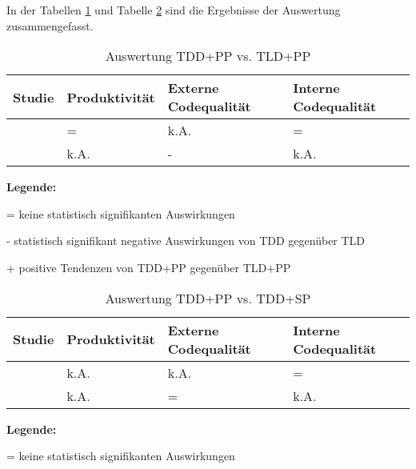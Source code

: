 In der Tabellen \ref{table:TDD+PPAuswertungTDD+PPvsTLD+PP} und Tabelle \ref{table:TDD+PPAuswertungTDD+PPvsTDD+SP} sind die Ergebnisse der Auswertung zusammengefasst.

\begin{table}[bth]
\renewcommand{\arraystretch}{1.3}
\caption{Auswertung TDD+PP vs. TLD+PP}
\label{table:TDD+PPAuswertungTDD+PPvsTLD+PP}
\centering
\begin{threeparttable}
\begin{tabularx}{\columnwidth}{@{}llll@{}}
\toprule
Studie & Produktivität & Externe Codequalität & Interne Codequalität \\ \midrule
\cite{Flohr2006LessonsTeachings} & =\tnote{+} & k.A. & = \\
\cite{Madeyski2005PreliminaryQuality} & k.A. & - & k.A. \\ \bottomrule
\end{tabularx}
\medskip
      \footnotesize\textbf{Legende:}\smallskip
      \begin{tablenotes}\footnotesize
      \item = keine statistisch signifikanten Auswirkungen
      \item - statistisch signifikant negative Auswirkungen von TDD gegenüber TLD
      \item[+] positive Tendenzen von TDD+PP gegenüber TLD+PP
      \end{tablenotes}
\end{threeparttable}
\end{table}

\begin{table}[bth]
\renewcommand{\arraystretch}{1.3}
\caption{Auswertung TDD+PP vs. TDD+SP}
\label{table:TDD+PPAuswertungTDD+PPvsTDD+SP}
\centering
\begin{threeparttable}
\begin{tabularx}{\columnwidth}{@{}llll@{}}
\toprule
Studie & Produktivität & Externe Codequalität & Interne Codequalität \\ \midrule
\cite{Madeyski2007OnTests} & k.A. & k.A. & = \\
\cite{Madeyski2005PreliminaryQuality} & k.A. & = & k.A. \\ \bottomrule
\end{tabularx}
\medskip
      \footnotesize\textbf{Legende:}\smallskip
      \begin{tablenotes}\footnotesize
      \item = keine statistisch signifikanten Auswirkungen
      \end{tablenotes}
\end{threeparttable}
\end{table}

